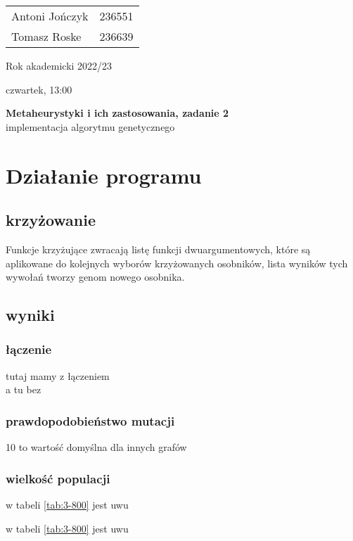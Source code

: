 \documentclass{article}
\begin{document}
\begin{minipage}{0.35\linewidth}
	\begin{tabular}{lr}
		Antoni Jończyk & 236551 \\
		Tomasz Roske   & 236639
	\end{tabular} \hfill
\end{minipage}
\hfill
\begin{minipage}{0.35\linewidth}
	\hfill Rok akademicki 2022/23 \par
	\hfill czwartek, 13:00
\end{minipage}
\bigskip \bigskip \bigskip \bigskip \bigskip
\begin{center}
	\textbf{Metaheurystyki i ich zastosowania, zadanie 2}\\
	\bigskip
	\large implementacja algorytmu genetycznego
\end{center}
\bigskip \bigskip
\section{Działanie programu}
\subsection{krzyżowanie}
Funkcje krzyżujące zwracają listę funkcji dwuargumentowych, które są aplikowane
do kolejnych wyborów krzyżowanych osobników, lista wyników tych wywołań tworzy
genom nowego osobnika.
\newpage



\subsection{wyniki}
\subsubsection{łączenie}
tutaj mamy z łączeniem \\

a tu bez \\

\subsubsection{prawdopodobieństwo mutacji}

10 to wartość domyślna dla innych grafów





\subsubsection{wielkość populacji}





w tabeli                \ref{tab:3-800}  jest uwu

w tabeli                \ref{tab:3-800}  jest uwu
\end{document}
